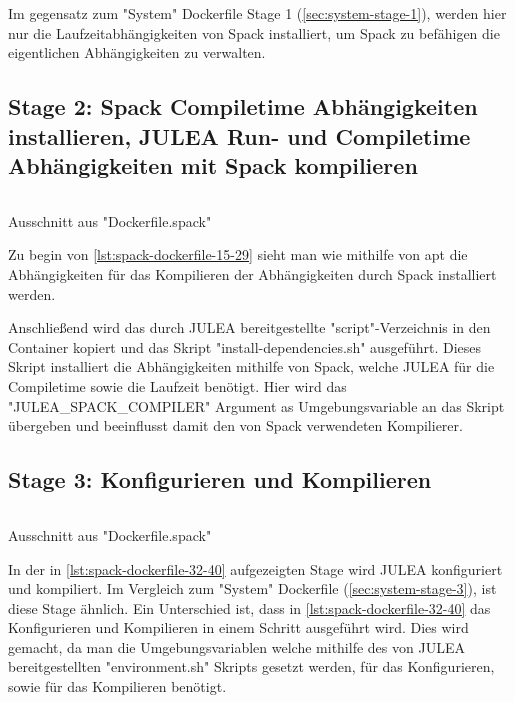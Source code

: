 Im gegensatz zum "System" Dockerfile Stage 1 (\cref{sec:system-stage-1}), werden hier nur die Laufzeitabhängigkeiten von Spack installiert, um Spack zu befähigen die eigentlichen Abhängigkeiten zu verwalten.


\subsection{Stage 2: Spack Compiletime Abhängigkeiten installieren, JULEA Run- und Compiletime Abhängigkeiten mit Spack kompilieren} \label{sec:spack-stage-2}

\begin{listing}[H]
    \inputminted[firstline=15,lastline=29]{dockerfile}{./code-examples/Dockerfile.spack}
    \caption{Ausschnitt aus "Dockerfile.spack"}
    \label{lst:spack-dockerfile-15-29}
\end{listing}

Zu begin von \cref{lst:spack-dockerfile-15-29} sieht man wie mithilfe von apt die Abhängigkeiten für das Kompilieren der Abhängigkeiten durch Spack installiert werden. 

Anschließend wird das durch JULEA bereitgestellte "script"-Verzeichnis in den Container kopiert und das Skript "install-dependencies.sh" ausgeführt. Dieses Skript installiert die Abhängigkeiten mithilfe von Spack, welche JULEA für die Compiletime sowie die Laufzeit benötigt. Hier wird das "JULEA\_SPACK\_COMPILER" Argument as Umgebungsvariable an das Skript übergeben und beeinflusst damit den von Spack verwendeten Kompilierer.


\subsection{Stage 3: Konfigurieren und Kompilieren} \label{sec:spack-stage-3}

\begin{listing}[H]
    \inputminted[firstline=32,lastline=40]{dockerfile}{./code-examples/Dockerfile.spack}
    \caption{Ausschnitt aus "Dockerfile.spack"}
    \label{lst:spack-dockerfile-32-40}
\end{listing}

In der in \cref{lst:spack-dockerfile-32-40} aufgezeigten Stage wird JULEA konfiguriert und kompiliert. Im Vergleich zum "System" Dockerfile (\cref{sec:system-stage-3}), ist diese Stage ähnlich. Ein Unterschied ist, dass in \cref{lst:spack-dockerfile-32-40} das Konfigurieren und Kompilieren in einem Schritt ausgeführt wird. Dies wird gemacht, da man die Umgebungsvariablen welche mithilfe des von JULEA bereitgestellten "environment.sh" Skripts gesetzt werden, für das Konfigurieren, sowie für das Kompilieren benötigt. 

